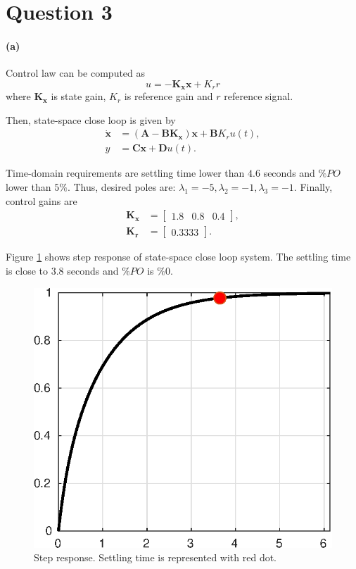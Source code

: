 \section{Question 3}
\paragraph{(a)} Control law can be computed as
\begin{equation}
	u = -\mathbf{K_x x} + K_r r
\end{equation}
\noindent where $\mathbf{K_x}$ is state gain, $K_r$ is reference gain and $r$ reference signal.

Then, state-space close loop is given by
\begin{align*}
\mathbf{\dot{x}} &= (\mathbf{A}-\mathbf{B K_x})\mathbf{x} + \mathbf{B} K_r u(t), \\
y &= \mathbf{C} \mathbf{x} + \mathbf{D} u(t).
\end{align*}

Time-domain requirements are settling time lower than $4.6$ seconds and $\%PO$ lower than $5\%$. Thus, desired poles are: $\lambda_1 = -5, \lambda_2 = -1, \lambda_3 = -1$. Finally, control gains are
\begin{align*}
\mathbf{K_x} &= 
\begin{bmatrix}
1.8 & 0.8 & 0.4
\end{bmatrix}, \\
\mathbf{K_r} &= 
\begin{bmatrix}
0.3333
\end{bmatrix}.
\end{align*}

Figure \ref{fig:step_response} shows step response of state-space close loop system. The settling time is close to $3.8$ seconds and $\%PO$ is $\%0$.

\begin{figure}[H]
\centering
\includegraphics{images/step_response.eps}
\caption{Step response. Settling time is represented with red dot.}
\label{fig:step_response}
\end{figure}











